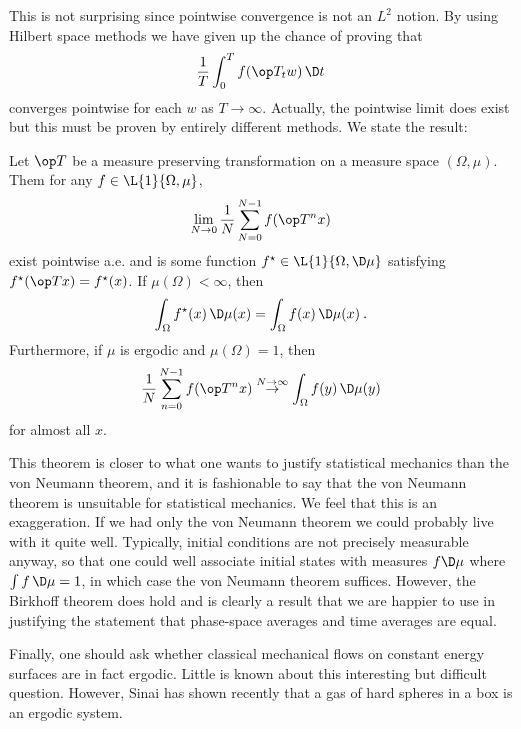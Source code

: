 This is not surprising since pointwise convergence is not an $L^2$ notion. By using Hilbert space methods we have given up the chance of proving that
\begin{align}
     \frac{1}{T} \int_0^T f(\op T_t w) \, \D t
\end{align}
converges pointwise for each $w$ as $T \rightarrow \infty$. 
Actually, the pointwise limit does exist but this must be proven by entirely different methods. We state the result:
\begin{theorem}
    Let $\op T$ be a measure preserving transformation on a measure space $(\Omega, \mu)$. Them for any $f \in \L{1}{\Omega, \mu}$, \begin{align}
        \lim_{N \rightarrow 0} \frac{1}{N} \sum_{N=0}^{N-1} f(\op T^n x)
    \end{align}
    exist pointwise a.e. and is some function $f^\star \in \L{1}{\Omega, \D \mu}$ satisfying $f^\star (\op T x) = f^\star (x)$. If $\mu(\Omega) < \infty$, then \begin{align}
        \int_\Omega f^\star (x) \, \D \mu(x) = \int_\Omega f(x) \, \D \mu (x) \:.
    \end{align}
    Furthermore, if $\mu$ is ergodic and $\mu(\Omega) = 1$, then \begin{align}
        \frac{1}{N} \sum_{n=0}^{N-1} f(\op T^n x) \overset{N \rightarrow \infty}\rightarrow \int_\Omega f(y) \, \D \mu(y)
    \end{align}
    for almost all $x$.
\end{theorem}

This theorem is closer to what one wants to justify statistical mechanics than the von Neumann theorem, and it is fashionable to say that the von Neumann theorem is unsuitable for statistical mechanics. We feel that this is an exaggeration. If we had only the von Neumann theorem we could probably live with it quite well. Typically, initial conditions are not precisely measurable anyway, so that one could well associate initial states with measures $f \D \mu$ where $\int f \, \D \mu = 1$, in which case the von Neumann theorem suffices. However, the Birkhoff theorem does hold and is clearly a result that we are happier to use in justifying the statement that phase-space averages and time averages are equal.

Finally, one should ask whether classical mechanical flows on constant energy surfaces are in fact ergodic. Little is known about this interesting but difficult question. However, Sinai has shown recently that a gas of hard
spheres in a box is an ergodic system.